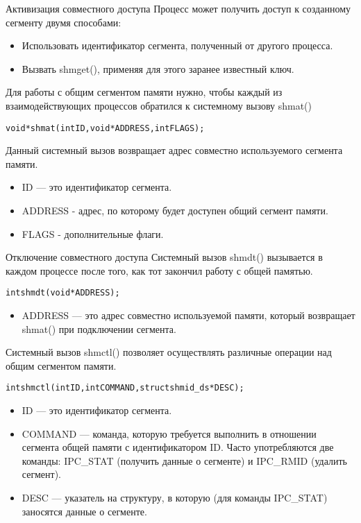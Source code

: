 \documentclass{beamer}
\begin{document}
\begin{frame}[fragile]{Активизация совместного доступа}
Процесс может получить доступ к созданному сегменту двумя способами:
\begin{itemize}
\item Использовать идентификатор сегмента, полученный от другого процесса.
\item Вызвать shmget(), применяя для этого заранее известный ключ.
\end{itemize}
Для работы с общим сегментом памяти нужно, чтобы каждый из взаимодействующих процессов обратился к системному вызову shmat()
\begin{alltt}
void * shmat (int ID, void * ADDRESS, int FLAGS);
\end{alltt}
Данный системный вызов возвращает адрес совместно используемого сегмента памяти. 
\begin{itemize}
\item ID — это идентификатор сегмента. 
\item ADDRESS - адрес, по которому будет доступен общий сегмент памяти. 
\item FLAGS - дополнительные флаги.
\end{itemize}
\end{frame}

\begin{frame}[fragile]{Отключение совместного доступа}
Системный вызов shmdt() вызывается в каждом процессе после того, как тот закончил работу с общей памятью. 
\begin{alltt}
int shmdt (void * ADDRESS);
\end{alltt}
\begin{itemize}
\item ADDRESS — это адрес совместно используемой памяти, который возвращает shmat() при подключении сегмента.
\end{itemize}
Системный вызов shmctl() позволяет осуществлять различные операции над общим сегментом памяти.
\begin{alltt}
int shmctl (int ID, int COMMAND, struct shmid_ds * DESC);
\end{alltt}
\begin{itemize}
\item ID — это идентификатор сегмента. 
\item COMMAND — команда, которую требуется выполнить в отношении сегмента общей памяти с идентификатором ID. Часто употребляются две команды: IPC\_STAT (получить данные о сегменте) и IPC\_RMID (удалить сегмент).
\item DESC — указатель на структуру, в которую (для команды IPC\_STAT) заносятся данные о сегменте. 
\end{itemize}
\end{frame}
\end{document}
